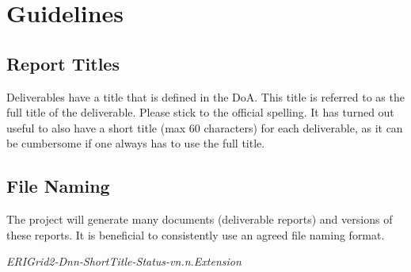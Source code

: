 
\clearpage
\section{Guidelines}
\label{sec:guidelines}


\subsection{Report Titles}
\label{sec:report-titles}

Deliverables have a title that is defined in the \ac{DoA}. This title is referred to as the full title of the deliverable. Please stick to the official spelling. It has turned out useful to also have a short title (max 60 characters) for each deliverable, as it can be cumbersome if one always has to use the full title. 

\subsection{File Naming}
\label{sec:file-naming}

The project will generate many documents (deliverable reports) and versions of these reports. It is beneficial to consistently use an agreed file naming format. 

\textit{ERIGrid2-Dnn-ShortTitle-Status-vn.n.Extension}

